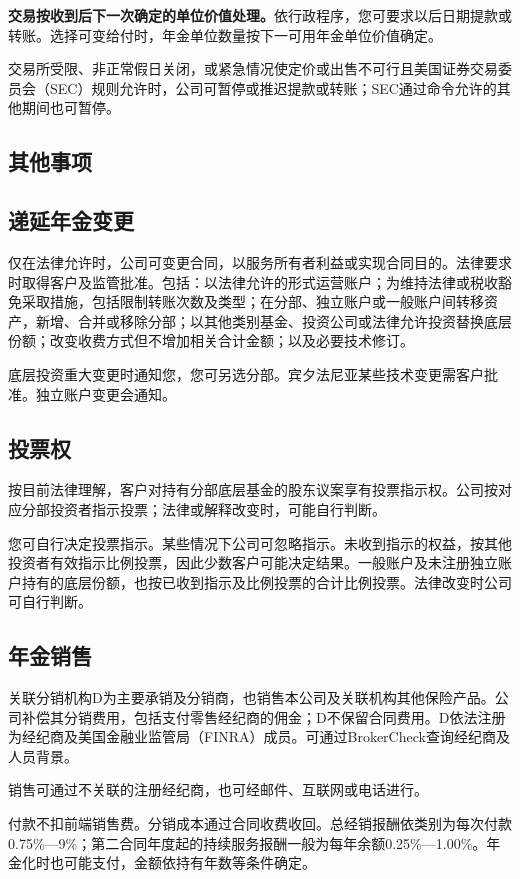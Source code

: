 \documentclass[UTF8,fontset=none,11pt,a4paper]{ctexart}
\begin{document}
\textbf{交易按收到后下一次确定的单位价值处理。}依行政程序，您可要求以后日期提款或转账。选择可变给付时，年金单位数量按下一可用年金单位\allowbreak\mbox{价值确定。}


交易所受限、非正常假日关闭，或紧急情况使定价或出售不可行且美国证券交易委员会（SEC）规则允许时，公司可暂停或推迟提款或转账；SEC通过命令允许的其他期间也\allowbreak\mbox{可暂停。}


\subsection*{其他事项}
\subsection*{递延年金变更}
仅在法律允许时，公司可变更合同，以服务所有者利益或实现合同目的。法律要求时取得客户及监管批准。包括：以法律允许的形式运营账户；为维持法律或税收豁免采取措施，包括限制转账次数及类型；在分部、独立账户或一般账户间转移资产，新增、合并或移除分部；以其他类别基金、投资公司或法律允许投资替换底层份额；改变收费方式但不增加相关合计金额；以及必要\allowbreak\mbox{技术修订。}


底层投资重大变更时通知您，您可另选分部。宾夕法尼亚某些技术变更需客户批准。独立账户变\allowbreak\mbox{更会通知。}


\subsection*{投票权}
按目前法律理解，客户对持有分部底层基金的股东议案享有投票指示权。公司按对应分部投资者指示投票；法律或解释改变时，可能\allowbreak\mbox{自行判断。}


您可自行决定投票指示。某些情况下公司可忽略指示。未收到指示的权益，按其他投资者有效指示比例投票，因此少数客户可能决定结果。一般账户及未注册独立账户持有的底层份额，也按已收到指示及比例投票的合计比例投票。法律改变时公司可\allowbreak\mbox{自行判断。}


\subsection*{年金销售}
关联分销机构D为主要承销及分销商，也销售本公司及关联机构其他保险产品。公司补偿其分销费用，包括支付零售经纪商的佣金；D不保留合同费用。D依法注册为经纪商及美国金融业监管局（FINRA）成员。可通过BrokerCheck查询经纪商及人\allowbreak\mbox{员背景。}


销售可通过不关联的注册经纪商，也可经邮件、互联网或\allowbreak\mbox{电话进行。}


付款不扣前端销售费。分销成本通过合同收费收回。总经销报酬依类别为每次付款0.75\%—9\%；第二合同年度起的持续服务报酬一般为每年余额0.25\%—1.00\%。年金化时也可能支付，金额依持有年数等\allowbreak\mbox{条件确定。}
\end{document}
